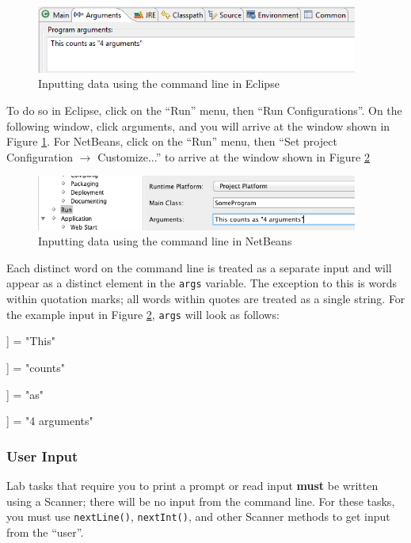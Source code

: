 \documentclass[]{article}
\begin{document}
\begin{figure}[!h]
	\centering
	\includegraphics[width=300pt]{Images/CommandLineEclipse}
	\caption{Inputting data using the command line in Eclipse}
	\label{fig:commandLineEclipse}
\end{figure}

To do so in Eclipse, click on the ``Run'' menu, then ``Run Configurations''. On the following window, click arguments, and you will arrive at the window shown in Figure \ref{fig:commandLineEclipse}. For NetBeans, click on the ``Run'' menu, then ``Set project Configuration $\rightarrow$ Customize...'' to arrive at the window shown in Figure \ref{fig:commandLineNetBeans}\\

\begin{figure}[!h]
	\centering
	\includegraphics[width=300pt]{Images/CommandLineNetBeans}
	\caption{Inputting data using the command line in NetBeans}
	\label{fig:commandLineNetBeans}
\end{figure}

Each distinct word on the command line is treated as a separate input and will appear as a distinct element in the \verb|args| variable. The exception to this is words within quotation marks; all words within quotes are treated as a single string. For the example input in Figure \ref{fig:commandLineNetBeans}, \verb|args| will look as follows:
\begin{description}
	\setlength{\itemsep}{-.3em}
	\item[args[0]] = "This"
	\item[args[1]] = "counts"
	\item[args[2]] = "as"
	\item[args[3]] = "4 arguments"
\end{description}

\subsubsection{User Input}
Lab tasks that require you to print a prompt or read input \textbf{must} be written using a Scanner; there will be no input from the command line. For these tasks, you must use \verb|nextLine()|, \verb|nextInt()|, and other Scanner methods to get input from the ``user''.\\
\end{document}
